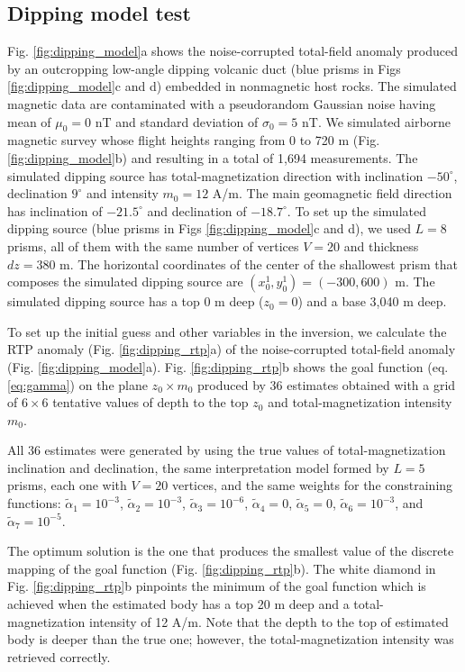 \subsection{Dipping model test}

Fig. \ref{fig:dipping_model}a shows the noise-corrupted total-field anomaly produced by an outcropping low-angle dipping volcanic duct (blue prisms in Figs \ref{fig:dipping_model}c and d) embedded in nonmagnetic host rocks. 
The simulated magnetic data are contaminated with a pseudorandom Gaussian noise having mean of $ \mu_0=0 $ nT and standard deviation of $ \sigma_0 = 5 $ nT.
We simulated airborne magnetic survey whose flight heights ranging from 0 to 720 m
(Fig. \ref{fig:dipping_model}b) and resulting in a total of 1,694 measurements.
The simulated dipping source has total-magnetization direction with inclination 
$ -50^\circ $, declination $ 9^\circ $ and intensity $ m_0 = 12 $ A/m.
The main geomagnetic field direction  has inclination of  $ -21.5^\circ $ and  declination of $ -18.7^\circ $.
To set up the simulated dipping source (blue prisms in Figs \ref{fig:dipping_model}c and d),
we used $L=8$ prisms, all of them with the same number of vertices $ V = 20 $ and thickness 
$ dz = 380 $ m. 
The horizontal coordinates of the center of the shallowest prism that composes the
simulated dipping source are $ (x_0^1, y_0^1) = (-300, 600) $ m. 
The simulated dipping source has a top  0 m deep ($z_0 = 0$) and a base 3,040 m deep.

To set up the initial guess and other variables in the inversion, we calculate the RTP anomaly (Fig. \ref{fig:dipping_rtp}a) of the noise-corrupted total-field anomaly (Fig. \ref{fig:dipping_model}a).
Fig. \ref{fig:dipping_rtp}b  shows the goal function (eq. \ref{eq:gamma}) on the plane 
$z_0 \times m_0 $ produced by 36 estimates obtained with a grid of $6 \times 6$ tentative values of depth to the top $z_0$ and total-magnetization intensity $m_0$. 

All 36 estimates were generated by using the true values of total-magnetization inclination and declination, the same interpretation model formed by $ L = 5 $ prisms, 
each one with $ V = 20 $ vertices, and the same weights for the constraining functions: 
$\tilde{\alpha}_1 = 10^{-3}$, 
$\tilde{\alpha}_2 = 10^{-3}$, 
$\tilde{\alpha}_3 = 10^{-6}$, 
$\tilde{\alpha}_4 = 0$, 
$\tilde{\alpha}_5 = 0$, 
$\tilde{\alpha}_6 = 10^{-3}$, and 
$\tilde{\alpha}_7 = 10^{-5}$. 


The optimum solution is the one that produces the smallest value of the discrete mapping 
of the goal function (Fig. \ref{fig:dipping_rtp}b). 
The white diamond in Fig. \ref{fig:dipping_rtp}b pinpoints the minimum of the goal function which is achieved when the estimated body has a top  20 m deep and a total-magnetization intensity of 12 A/m. 
Note that the depth to the top of estimated body is deeper than the true one; 
however, the total-magnetization intensity was retrieved correctly.

